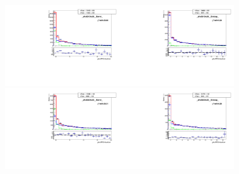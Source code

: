 \begin{figure}[htb]
  \begin{center}
   \includegraphics[width=0.45\textwidth]{../figs/figs_v11/ELECTRON_WGamma/TemplateFits/c_TEMPL_CHISO_UNblind__phoEt15to20__Barrel__RooFit.pdf}\includegraphics[width=0.45\textwidth]{../figs/figs_v11/ELECTRON_WGamma/TemplateFits/c_TEMPL_CHISO_UNblind__phoEt15to20__Endcap__RooFit.pdf}\\
   \includegraphics[width=0.45\textwidth]{../figs/figs_v11/ELECTRON_WGamma/TemplateFits/c_TEMPL_CHISO_UNblind__phoEt20to25__Barrel__RooFit.pdf}\includegraphics[width=0.45\textwidth]{../figs/figs_v11/ELECTRON_WGamma/TemplateFits/c_TEMPL_CHISO_UNblind__phoEt20to25__Endcap__RooFit.pdf}\\

\end{center}
\end{figure}
